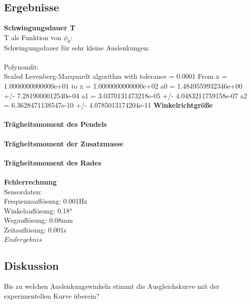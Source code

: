\documentclass{article}
\begin{document}
\subsection{Ergebnisse}
\textbf{Schwingungsdauer T}\\
T als Funktion von $\phi_0$: \\
Schwingungsdauer für sehr kleine Auslenkungen:\\
\\
Polynomfit:\\
Scaled Levenberg-Marquardt algorithm with tolerance = 0.0001
From x = 1.0000000000000e+01 to x = 1.0000000000000e+02
a0 = 1.4849559932346e+00 +/- 7.2819000012540e-04
a1 = 3.0370131473218e-05 +/- 4.0483211759158e-07
a2 = 6.3628471138547e-10 +/- 4.0785013174204e-11
\textbf{Winkelrichtgröße}\\
\\
\textbf{Trägheitsmoment des Pendels}\\
\\
\textbf{Trägheitsmoment der Zusatzmasse}\\
\\
\textbf{Trägheitsmoment des Rades}\\
\\
\textbf{Fehlerrechnung}\\
Sensordaten:\\
Frequenzauflösung: 0.001Hz\\
Winkelauflösung: 0.18°\\
Wegauflösung: 0.08mm\\
Zeitauflösung: 0.001s\\
$\boxed{Endergebnis}$ %
\subsection{Diskussion}
Bis zu welchen Auslenkungswinkeln stimmt die Ausgleichskurve mit der experimentellen Kurve überein? 
\end{document}
